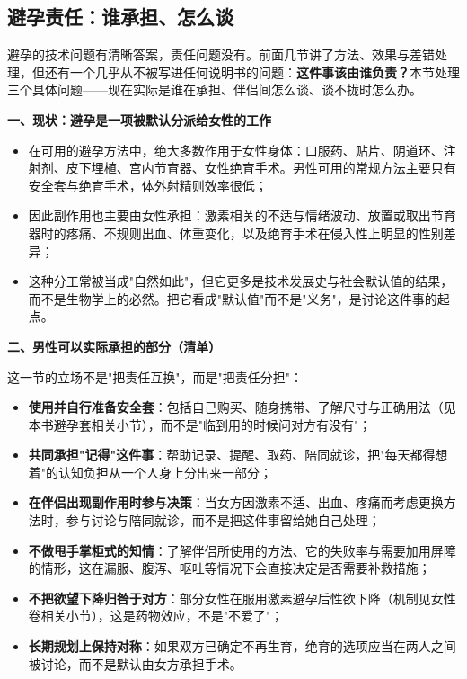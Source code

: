 \subsection{避孕责任：谁承担、怎么谈}

避孕的技术问题有清晰答案，责任问题没有。前面几节讲了方法、效果与差错处理，但还有一个几乎从不被写进任何说明书的问题：\textbf{这件事该由谁负责？}本节处理三个具体问题——现在实际是谁在承担、伴侣间怎么谈、谈不拢时怎么办。

\textbf{一、现状：避孕是一项被默认分派给女性的工作}

\begin{itemize}
\item 在可用的避孕方法中，绝大多数作用于女性身体：口服药、贴片、阴道环、注射剂、皮下埋植、宫内节育器、女性绝育手术。男性可用的常规方法主要只有安全套与绝育手术，体外射精则效率很低；
\item 因此副作用也主要由女性承担：激素相关的不适与情绪波动、放置或取出节育器时的疼痛、不规则出血、体重变化，以及绝育手术在侵入性上明显的性别差异；
\item 这种分工常被当成"自然如此"，但它更多是技术发展史与社会默认值的结果，而不是生物学上的必然。把它看成"默认值"而不是"义务"，是讨论这件事的起点。
\end{itemize}

\textbf{二、男性可以实际承担的部分（清单）}

这一节的立场不是"把责任互换"，而是"把责任分担"：

\begin{itemize}
\item \textbf{使用并自行准备安全套}：包括自己购买、随身携带、了解尺寸与正确用法（见本书避孕套相关小节），而不是"临到用的时候问对方有没有"；
\item \textbf{共同承担"记得"这件事}：帮助记录、提醒、取药、陪同就诊，把"每天都得想着"的认知负担从一个人身上分出来一部分；
\item \textbf{在伴侣出现副作用时参与决策}：当女方因激素不适、出血、疼痛而考虑更换方法时，参与讨论与陪同就诊，而不是把这件事留给她自己处理；
\item \textbf{不做甩手掌柜式的知情}：了解伴侣所使用的方法、它的失败率与需要加用屏障的情形，这在漏服、腹泻、呕吐等情况下会直接决定是否需要补救措施；
\item \textbf{不把欲望下降归咎于对方}：部分女性在服用激素避孕后性欲下降（机制见女性卷相关小节），这是药物效应，不是"不爱了"；
\item \textbf{长期规划上保持对称}：如果双方已确定不再生育，绝育的选项应当在两人之间被讨论，而不是默认由女方承担手术。
\end{itemize}

